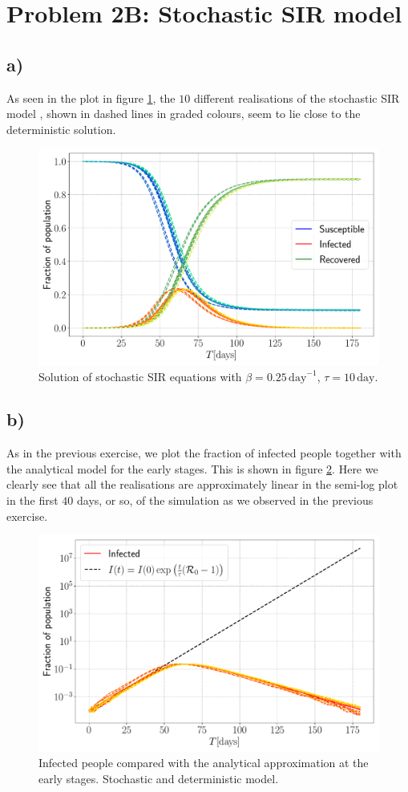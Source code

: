 \section{Problem 2B: Stochastic SIR model}

\subsection{a)}

As seen in the plot in figure \ref{fig:SIR_stoch}, the $10$ different realisations of the stochastic SIR model , shown in dashed lines in graded colours, seem to lie close to the deterministic solution.

\begin{figure}[htb]
	\centering
	\includegraphics[width=0.8\columnwidth]{../fig/2Ba_SIR.pdf}
	\caption{Solution of stochastic SIR equations with $\beta = 0.25\, \mathrm{day}^{-1}$, $\tau = 10\, \mathrm{day}$.}
	\label{fig:SIR_stoch}
\end{figure}

\subsection{b)}

As in the previous exercise, we plot the fraction of infected people together with the analytical model for the early stages. This is shown in figure \ref{fig:Infected_stoch}. Here we clearly see that all the realisations are approximately linear in the semi-log plot in the first $40$ days, or so, of the simulation as we observed in the previous exercise. 

\begin{figure}[htb]
	\centering
	\includegraphics[width=0.8\columnwidth]{../fig/2Bb_I.pdf}
	\caption{Infected people compared with the analytical approximation at the early stages. Stochastic and deterministic model.}
	\label{fig:Infected_stoch}
\end{figure}


